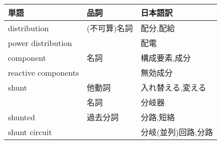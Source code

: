 \begin{table}[ht]
  \begin{tabular}{l|ll}
  単語                & 品詞      & 日本語訳          \\ \hline
  distribution        & (不可算)名詞 & 配分,配給      \\
  power distribution  &         & 配電                \\ \hline
  component           & 名詞      & 構成要素,成分     \\
  reactive components &         & 無効成分            \\ \hline
  shunt               & 他動詞  & 入れ替える,変える   \\
                      & 名詞    & 分岐器              \\
  shunted             & 過去分詞& 分路,短絡           \\ 
  shunt circuit       &         & 分岐(並列)回路,分路 \\ \hline
  
  
  \end{tabular}
\end{table}